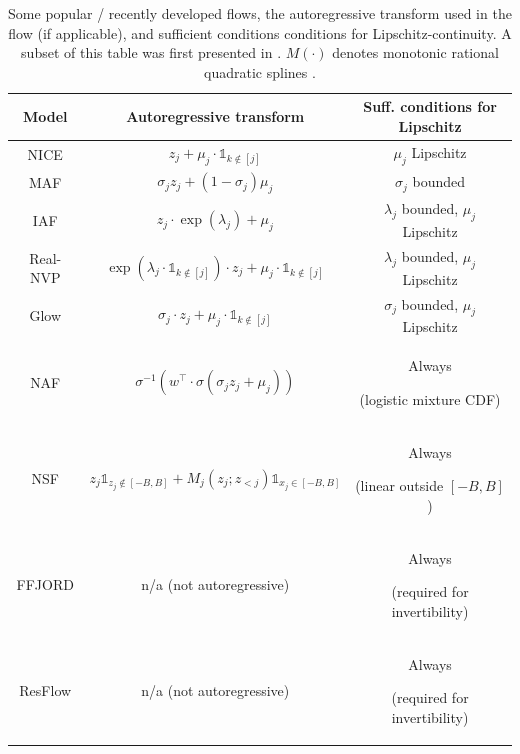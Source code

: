 \documentclass{article}
\theoremstyle{definition}
\theoremstyle{remark}
\begin{document}
\begin{table}
  \centering
  \begin{tabular}{ccc}
    \toprule
    Model                                  & Autoregressive transform                                                                              & Suff. conditions for Lipschitz         \\
    \midrule
    NICE\citep{dinh2014nice}               & $z_j + \mu_j \cdot \mathds{1}_{k \not \in [j]}$                                                       & $\mu_j$ Lipschitz                      \\
    MAF\citep{papamakarios2017masked}      & $\sigma_j z_j + (1 - \sigma_j) \mu_j$                                                                 & $\sigma_j$ bounded                     \\
    IAF\citep{kingma2016improved}          & $z_j \cdot \exp(\lambda_j) + \mu_j$                                                                   & $\lambda_j$ bounded, $\mu_j$ Lipschitz \\
    Real-NVP\citep{dinh2016density}        & $\exp(\lambda_j \cdot \mathds{1}_{k \not\in[j]}) \cdot z_j + \mu_j \cdot \mathds{1}_{k \not \in [j]}$ & $\lambda_j$ bounded, $\mu_j$ Lipschitz \\
    Glow\citep{kingma2018glow}             & $\sigma_j \cdot z_j + \mu_j \cdot \mathds{1}_{k \not\in [j]}$                                         & $\sigma_j$ bounded, $\mu_j$ Lipschitz  \\
    NAF\citep{huang2018neural}             & $\sigma^{-1}(w^\top \cdot \sigma(\sigma_j z_j + \mu_j))$                                              & Always \par (logistic mixture CDF)          \\
    NSF\citep{durkan2019neural}            & $z_j \mathds{1}_{z_j \not\in [-B,B]} + M_j(z_j;z_{<j}) \mathds{1}_{x_j \in [-B,B]}$         & Always \par (linear outside $[-B,B]$)     \\
    FFJORD\citep{grathwohl2018ffjord} & n/a (not autoregressive)                                                                              & Always \par (required for invertibility)    \\
    ResFlow\citep{chen2019residual} & n/a (not autoregressive)                                                                              & Always \par (required for invertibility)    \\
    \bottomrule
  \end{tabular}
  \caption{Some popular / recently developed flows, the autoregressive transform used in the flow (if applicable),
  and sufficient conditions conditions for Lipschitz-continuity. A subset of this table was first presented
  in \citep{jaini2020tails}. $M(\cdot)$ denotes monotonic rational quadratic splines \citep{durkan2019neural}.}
  \label{tab:flows}
\end{table}
\end{document}
